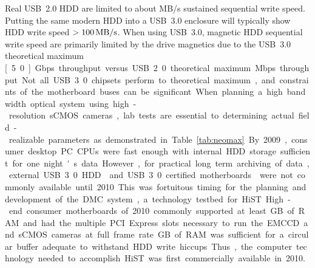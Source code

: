 Real USB~2.0 HDD are limited to about \unit[40]{MB/s} sustained sequential write speed.
Putting the same modern HDD into a USB~3.0 enclosure will typically show HDD write speed $>\unit[100]{MB/s}$.
When using USB~3.0, magnetic HDD sequential write speed are primarily limited by the drive magnetics due to the USB~3.0 theoretical maximum \unit[5.0]{Gbps} throughput versus USB~2.0 theoretical maximum \unit[480]{Mbps} throughput.
Not all USB~3.0 chipsets perform to theoretical maximum, and constraints of the motherboard buses can be significant.
When planning a high bandwidth optical system using high-resolution sCMOS cameras, lab tests are essential to determining actual field-realizable parameters as demonstrated in Table~\ref{tab:neomax}.

By 2009, consumer desktop PC CPUs were fast enough with internal HDD storage sufficient for one night's data.
However, for practical long term archiving of data, external USB~3.0 HDD \citep{firstusb3hdd} and USB~3.0 certified motherboards \citep{firstusb3pc} were not commonly available until 2010.
This was fortuitous timing for the planning and development of the DMC system, a technology testbed for HiST.
High-end consumer motherboards of 2010 commonly supported at least \unit[16]{GB} of RAM and had the multiple PCI Express slots necessary to run the EMCCD and sCMOS cameras at full frame rate.
\unit[16]{GB} of RAM was sufficient for a circular buffer adequate to withstand HDD write hiccups.
Thus, the computer technology needed to accomplish HiST was first commercially available in 2010.

